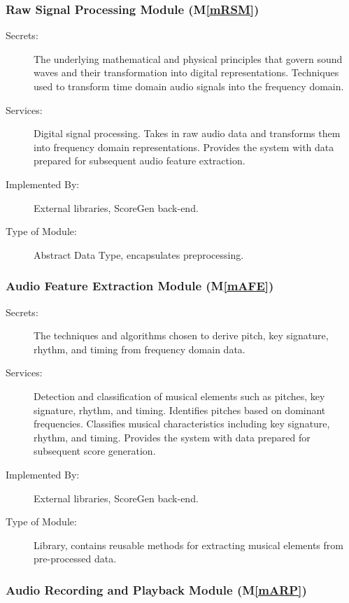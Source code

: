\documentclass[12pt, titlepage]{article}
\newcommand{\mref}[1]{M\ref{#1}}
\begin{document}
\subsubsection{Raw Signal Processing Module (\mref{mRSM})}

\begin{description}
\item[Secrets:] The underlying mathematical and physical principles that govern sound waves and their transformation into digital representations.
  Techniques used to transform time domain audio signals into the frequency domain.
\item[Services:] Digital signal processing.
  Takes in raw audio data and transforms them into frequency domain representations.
  Provides the system with data prepared for subsequent audio feature extraction.
\item[Implemented By:] External libraries, ScoreGen back-end.
\item[Type of Module:] Abstract Data Type, encapsulates preprocessing.
\end{description}

\subsubsection{Audio Feature Extraction Module (\mref{mAFE})}

\begin{description}
\item[Secrets:] The techniques and algorithms chosen to derive pitch, key signature, rhythm, and timing from frequency domain data.
\item[Services:] Detection and classification of musical elements such as pitches, key signature, rhythm, and timing.
  Identifies pitches based on dominant frequencies.
  Classifies musical characteristics including key signature, rhythm, and timing.
  Provides the system with data prepared for subsequent score generation.
\item[Implemented By:] External libraries, ScoreGen back-end.
\item[Type of Module:] Library, contains reusable methods for extracting musical elements from pre-processed data.
\end{description}

\subsubsection{Audio Recording and Playback Module (\mref{mARP})}
\end{document}
